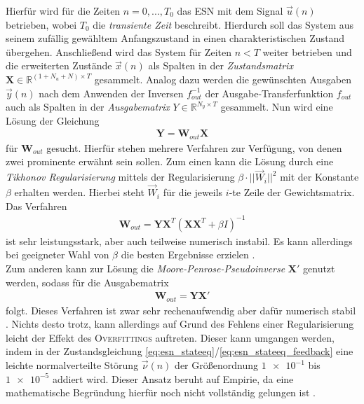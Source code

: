 Hierfür wird für die Zeiten $n=0, ..., T_0$ das \textsc{ESN} mit dem Signal $\vec{u}(n)$ betrieben, wobei $T_0$ die \textit{transiente Zeit} beschreibt. Hierdurch soll das System aus seinem zufällig gewähltem Anfangszustand in einen charakteristischen Zustand übergehen. Anschließend wird das System für Zeiten $n < T$ weiter betrieben und die erweiterten Zustände $\vec{x}(n)$ als Spalten in der \textit{Zustandsmatrix} $\mathbf{X} \in \mathbb{R}^{(1 + N_u + N) \times T}$ gesammelt. Analog dazu werden die gewünschten Ausgaben $\vec{y}(n)$ nach dem Anwenden der Inversen $f^{-1}_{out}$ der Ausgabe-Transferfunktion $f_{out}$ auch als Spalten in der \textit{Ausgabematrix} $Y \in \mathbb{R}^{N_y \times T}$ gesammelt.
Nun wird eine Lösung der Gleichung
\begin{align}
\mathbf{Y} = \mathbf{W}_{out} \mathbf{X}
\end{align}
für $\mathbf{W}_{out}$ gesucht. Hierfür stehen mehrere Verfahren zur Verfügung, von denen zwei prominente erwähnt sein sollen.
Zum einen kann die Lösung durch eine \textit{Tikhonov Regularisierung} mittels der Regularisierung $\beta \cdot ||{\vec{W}_i}||^2$ mit der Konstante $\beta$ erhalten werden. Hierbei steht $\vec{W}_i$ für die jeweils $i$-te Zeile der Gewichtsmatrix. Das Verfahren
\begin{align}
\label{eq:tikhonov}
\mathbf{W}_{out} = \mathbf{Y} \mathbf{X}^T \left(\mathbf{X} \mathbf{X}^T + \beta I \right)^{-1}
\end{align}
ist sehr leistungsstark, aber auch teilweise numerisch instabil. Es kann allerdings bei geeigneter Wahl von $\beta$ die besten Ergebnisse erzielen \cite{lukoseviciusa2009}.\\

Zum anderen kann zur Lösung die \textit{Moore-Penrose-Pseudoinverse} $\mathbf{X}'$ genutzt werden, sodass für die Ausgabematrix
\begin{align}
\label{eq:pseudo_inverse}
\mathbf{W}_{out} = \mathbf{Y} \mathbf{X}'
\end{align}
folgt. Dieses Verfahren ist zwar sehr rechenaufwendig aber dafür numerisch stabil \cite{lukoseviciusa2009, jaeger2012}. Nichts desto trotz, kann allerdings auf Grund des Fehlens einer Regularisierung leicht der Effekt des \textsc{Overfittings} auftreten. Dieser kann umgangen werden, indem in der Zustandsgleichung \ref{eq:esn_stateeq}/\ref{eq:esn_stateeq_feedback} eine leichte normalverteilte Störung $\vec{\nu}(n)$ der Größenordnung $\num{1e-1}$ bis $\num{1e-5}$ addiert wird. Dieser Ansatz beruht auf Empirie, da eine mathematische Begründung hierfür noch nicht vollständig gelungen ist \citep{jaeger2010, lukoseviciusa2009}.\\


